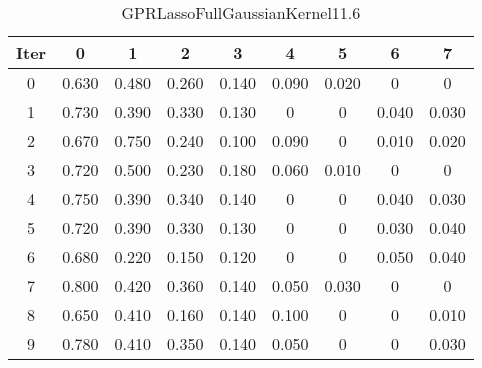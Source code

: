 \begin{table}
	\begin{center}
		\begin{tabular}{|c|c|c|c|c|c|c|c|c|}
			\hline
			Iter & 0 & 1 & 2 & 3 & 4 & 5 & 6 & 7 \\
			\hline
			0 & 0.630 & 0.480 & 0.260 & 0.140 & 0.090 & 0.020 & 0 & 0 \\
			\hline
			1 & 0.730 & 0.390 & 0.330 & 0.130 & 0 & 0 & 0.040 & 0.030 \\
			\hline
			2 & 0.670 & 0.750 & 0.240 & 0.100 & 0.090 & 0 & 0.010 & 0.020 \\
			\hline
			3 & 0.720 & 0.500 & 0.230 & 0.180 & 0.060 & 0.010 & 0 & 0 \\
			\hline
			4 & 0.750 & 0.390 & 0.340 & 0.140 & 0 & 0 & 0.040 & 0.030 \\
			\hline
			5 & 0.720 & 0.390 & 0.330 & 0.130 & 0 & 0 & 0.030 & 0.040 \\
			\hline
			6 & 0.680 & 0.220 & 0.150 & 0.120 & 0 & 0 & 0.050 & 0.040 \\
			\hline
			7 & 0.800 & 0.420 & 0.360 & 0.140 & 0.050 & 0.030 & 0 & 0 \\
			\hline
			8 & 0.650 & 0.410 & 0.160 & 0.140 & 0.100 & 0 & 0 & 0.010 \\
			\hline
			9 & 0.780 & 0.410 & 0.350 & 0.140 & 0.050 & 0 & 0 & 0.030 \\
			\hline
		\end{tabular}
	\end{center}
	\caption{GPRLassoFullGaussianKernel11.6}
\end{table}